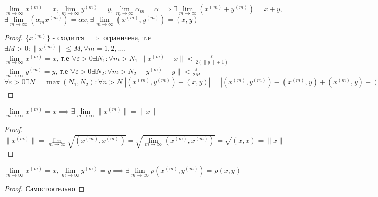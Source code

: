 \documentclass[../main.tex]{subfiles}
\begin{document}
\begin{theorem}
    $\lim\limits_{m \to \infty}x^{(m)}= x, \lim\limits_{m   \to \infty}y^{(m)}=y, \lim\limits_{ m   \to \infty  } \alpha_{m}=\alpha\implies \exists \lim\limits_{m  \to \infty  } \left(x^{(m)}+y^{(m)}\right) = x+y,$ \\$ \exists \lim\limits_{m    \to \infty  } \left( \alpha_{m}x^{(m)}\right) = \alpha x, \exists \lim\limits_{m    \to \infty  } \left(x^{(m)} ,y^{(m)}\right)=(x,y)$    
\end{theorem}
\begin{proof}
    $\{x^{(m)}\}$ - сходится $\implies $ ограничена, т.е $\exists M>0 : \|x^{(m)}\|\leqslant M, \forall m=1,2,\dots$.
   \\ $\lim\limits_{m \to \infty}x^{(m)} =x$, т.е $\forall \varepsilon>0 \exists N_{1}: \forall m> N_{1} \; \|x^{(m)}-x\|<\frac{\varepsilon}{2(\|y\|+1)}$
    \\$\lim\limits_{m   \to \infty}y^{(m)} =y  $, т.е $\forall \varepsilon>0 \exists N_{2}: \forall m>N_{2}\ \|y^{(m)}-y\|<\frac{\varepsilon}{2M}$
    \\$\forall \varepsilon>0 \exists N = \max{(N_{1},N_{2})}: \forall n> N \; \left| (x^{(m)},y^{(m)})-(x,y)\right| = \left| (x^{(m)},y^{(m)})-(x^{(m)},y)+(x^{(m)},y)-(x,y)\right|\leqslant \left| (x^{(m)},y^{(m)}-y)\right| + \left| (x^{(m)}-x,y)\right|\leqslant \|x^{(m)}\|\|y^{(m)}-y\|+\|x^{(m)}-x\|\|y\|< M\cdot \frac{\varepsilon}{2M} + \frac{\varepsilon}{2(\|y\| + 1)}\|y\| < \varepsilon$
\end{proof}
\begin{corollary}
    $\lim\limits_{m\to \infty}x^{(m)}=x\implies \exists \lim\limits_{m  \to \infty}\|x^{(m)}\| = \|x\|  $
\end{corollary}
\begin{proof}      
    $\|x^{(m)}\|=\lim\limits_{m \to \infty  } \sqrt{(x^{(m)},x^{(m)})}=\sqrt{\lim\limits_{m \to \infty  } (x^{(m)},x^{(m)})}=\sqrt{(x,x)}=\|x\|$
    
\end{proof}
\begin{corollary}
    $\lim\limits_{m \to \infty}x^{(m)}=x, \lim\limits_{m  \to \infty}y^{(m)}=y \implies \exists \lim\limits_{ m \to \infty}\rho(x^{(m)},y^{(m)})=\rho(x,y)   $
\end{corollary}
\begin{proof}
    Самостоятельно
\end{proof}
\end{document}
